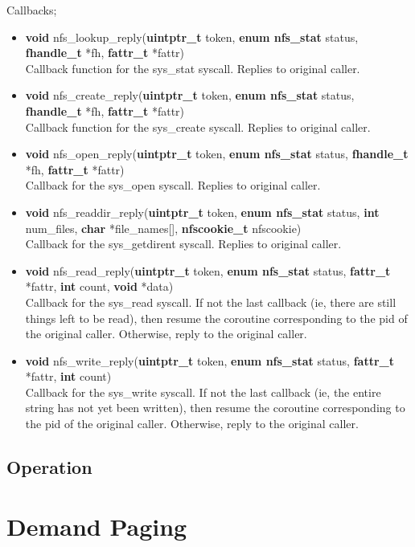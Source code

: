 \documentclass[12pt]{article}
\begin{document}
Callbacks;
\begin{itemize}
\item \textbf{void} nfs\_lookup\_reply(\textbf{uintptr\_t} token, \textbf{enum nfs\_stat} status, \textbf{fhandle\_t} *fh, \textbf{fattr\_t} *fattr)\\
Callback function for the sys\_stat syscall. Replies to original caller.
\item \textbf{void} nfs\_create\_reply(\textbf{uintptr\_t} token, \textbf{enum nfs\_stat} status, \textbf{fhandle\_t} *fh, \textbf{fattr\_t} *fattr)\\
Callback function for the sys\_create syscall. Replies to original caller.
\item \textbf{void} nfs\_open\_reply(\textbf{uintptr\_t} token, \textbf{enum nfs\_stat} status, \textbf{fhandle\_t} *fh, \textbf{fattr\_t} *fattr)\\
Callback for the sys\_open syscall. Replies to original caller.
\item \textbf{void} nfs\_readdir\_reply(\textbf{uintptr\_t} token, \textbf{enum nfs\_stat} status, \textbf{int} num\_files, \textbf{char} *file\_names[], \textbf{nfscookie\_t} nfscookie)\\
Callback for the sys\_getdirent syscall. Replies to original caller.
\item \textbf{void} nfs\_read\_reply(\textbf{uintptr\_t} token, \textbf{enum nfs\_stat} status, \textbf{fattr\_t} *fattr, \textbf{int} count, \textbf{void} *data)\\
Callback for the sys\_read syscall. If not the last callback (ie, there are still things left to be read), then resume the coroutine corresponding to the pid of the original caller. Otherwise, reply to the original caller.
\item \textbf{void} nfs\_write\_reply(\textbf{uintptr\_t} token, \textbf{enum nfs\_stat} status, \textbf{fattr\_t} *fattr, \textbf{int} count)\\
Callback for the sys\_write syscall. If not the last callback (ie, the entire string has not yet been written), then resume the coroutine corresponding to the pid of the original caller. Otherwise, reply to the original caller.
\end{itemize}
\subsection{Operation}

\clearpage
\section{Demand Paging}
\end{document}
